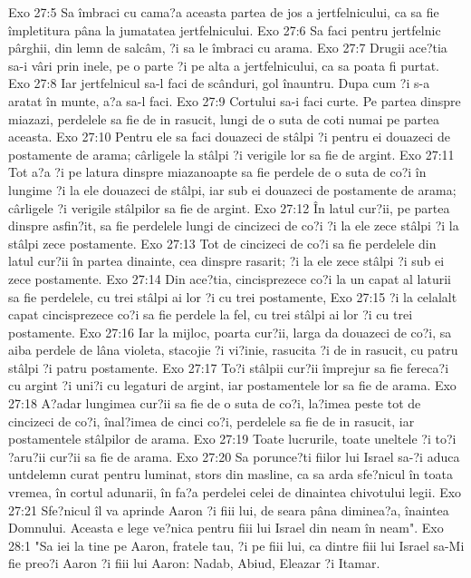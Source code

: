 Exo 27:5  Sa îmbraci cu cama?a aceasta partea de jos a jertfelnicului, ca sa fie împletitura pâna la jumatatea jertfelnicului.
Exo 27:6  Sa faci pentru jertfelnic pârghii, din lemn de salcâm, ?i sa le îmbraci cu arama.
Exo 27:7  Drugii ace?tia sa-i vâri prin inele, pe o parte ?i pe alta a jertfelnicului, ca sa poata fi purtat.
Exo 27:8  Iar jertfelnicul sa-l faci de scânduri, gol înauntru. Dupa cum ?i s-a aratat în munte, a?a sa-l faci.
Exo 27:9  Cortului sa-i faci curte. Pe partea dinspre miazazi, perdelele sa fie de in rasucit, lungi de o suta de coti numai pe partea aceasta.
Exo 27:10  Pentru ele sa faci douazeci de stâlpi ?i pentru ei douazeci de postamente de arama; cârligele la stâlpi ?i verigile lor sa fie de argint.
Exo 27:11  Tot a?a ?i pe latura dinspre miazanoapte sa fie perdele de o suta de co?i în lungime ?i la ele douazeci de stâlpi, iar sub ei douazeci de postamente de arama; cârligele ?i verigile stâlpilor sa fie de argint.
Exo 27:12  În latul cur?ii, pe partea dinspre asfin?it, sa fie perdelele lungi de cincizeci de co?i ?i la ele zece stâlpi ?i la stâlpi zece postamente.
Exo 27:13  Tot de cincizeci de co?i sa fie perdelele din latul cur?ii în partea dinainte, cea dinspre rasarit; ?i la ele zece stâlpi ?i sub ei zece postamente.
Exo 27:14  Din ace?tia, cincisprezece co?i la un capat al laturii sa fie perdelele, cu trei stâlpi ai lor ?i cu trei postamente,
Exo 27:15  ?i la celalalt capat cincisprezece co?i sa fie perdele la fel, cu trei stâlpi ai lor ?i cu trei postamente.
Exo 27:16  Iar la mijloc, poarta cur?ii, larga da douazeci de co?i, sa aiba perdele de lâna violeta, stacojie ?i vi?inie, rasucita ?i de in rasucit, cu patru stâlpi ?i patru postamente.
Exo 27:17  To?i stâlpii cur?ii împrejur sa fie fereca?i cu argint ?i uni?i cu legaturi de argint, iar postamentele lor sa fie de arama.
Exo 27:18  A?adar lungimea cur?ii sa fie de o suta de co?i, la?imea peste tot de cincizeci de co?i, înal?imea de cinci co?i, perdelele sa fie de in rasucit, iar postamentele stâlpilor de arama.
Exo 27:19  Toate lucrurile, toate uneltele ?i to?i ?aru?ii cur?ii sa fie de arama.
Exo 27:20  Sa porunce?ti fiilor lui Israel sa-?i aduca untdelemn curat pentru luminat, stors din masline, ca sa arda sfe?nicul în toata vremea, în cortul adunarii, în fa?a perdelei celei de dinaintea chivotului legii.
Exo 27:21  Sfe?nicul îl va aprinde Aaron ?i fiii lui, de seara pâna diminea?a, înaintea Domnului. Aceasta e lege ve?nica pentru fiii lui Israel din neam în neam".
Exo 28:1  "Sa iei la tine pe Aaron, fratele tau, ?i pe fiii lui, ca dintre fiii lui Israel sa-Mi fie preo?i Aaron ?i fiii lui Aaron: Nadab, Abiud, Eleazar ?i Itamar.
